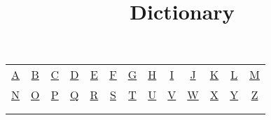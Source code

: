\documentclass{article}
\title{Dictionary}
\begin{document}
	\maketitle
	\begin{flushleft}
		\begin{tabular}{ c c c c c c c c c c c c c }
			\hyperref[tab:A]{A} & \hyperref[tab:B]{B} & \hyperref[tab:C]{C} & \hyperref[tab:D]{D} &
			\hyperref[tab:E]{E} & \hyperref[tab:F]{F} &
			\hyperref[tab:G]{G} & \hyperref[tab:H]{H} &
			\hyperref[tab:I]{I} & \hyperref[tab:J]{J} &
			\hyperref[tab:K]{K} & \hyperref[tab:L]{L} &
			\hyperref[tab:M]{M} \\ 
			\hyperref[tab:N]{N} & \hyperref[tab:O]{O} & \hyperref[tab:P]{P} & \hyperref[tab:Q]{Q} & \hyperref[tab:R]{R} &
			\hyperref[tab:S]{S} & \hyperref[tab:T]{T} &
			\hyperref[tab:U]{U} & \hyperref[tab:V]{V} &
			\hyperref[tab:W]{W} & \hyperref[tab:X]{X} &
			\hyperref[tab:Y]{Y} & \hyperref[tab:Z]{Z} \\ 
			
			\\ \\   
		\end{tabular}
	\end{flushleft}
	
\end{document}
